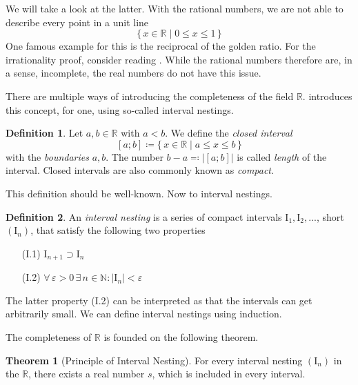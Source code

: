 \documentclass[a4paper, 10pt]{article}
\theoremstyle{remark}
\theoremstyle{definition}
\newtheorem{definition}{Definition}
\newtheorem*{theorem*}{Theorem}
\begin{document}
    We will take a look at the latter. With the rational numbers, we are not able to describe every point in a unit line
    \[
        \{\,x \in \mathbb{R} \mid 0 \leq x \leq 1 \,\}
    \]
    One famous example for this is the reciprocal of the golden ratio. For the irrationality proof, consider reading \cite{analysiskoenigsberger}. While the rational numbers therefore are, in a sense, incomplete, the real numbers do not have this issue.

    There are multiple ways of introducing the completeness of the field \(\mathbb{R}\). \cite{analysiskoenigsberger} introduces this concept, for one, using so-called interval nestings.

    \begin{definition}
        Let \(a, b \in \mathbb{R}\) with \(a < b\). We define the \emph{closed interval}
        \[
            [a; b] \coloneqq \{\, x \in \mathbb{R} \mid a \leq x \leq b \,\}
        \]
        with the \emph{boundaries} \(a, b\). The number \(b - a \eqqcolon |[a; b]|\) is called \emph{length} of the interval. Closed intervals are also commonly known as \emph{compact}.
    \end{definition}

    This definition should be well-known. Now to interval nestings.

    \newcommand{\intv}{\text{I}}
    \begin{definition}
        An \emph{interval nesting} is a series of compact intervals \(\intv_1, \intv_2, ...\), short \((\intv_n)\), that satisfy the following two properties

        \begin{itemize}[label={}]
            \item[(I.1)] \(\intv_{n+1} \supset \intv_n\)
            
            \item[(I.2)] \(\forall \, \varepsilon > 0 \, \exists \, n \in \mathbb{N}\colon |\intv_n| < \varepsilon\)
        \end{itemize}

    \end{definition}

    The latter property (I.2) can be interpreted as that the intervals can get arbitrarily small. We can define interval nestings using induction.

    The completeness of \(\mathbb{R}\) is founded on the following theorem.

    \begin{mdframed}[innertopmargin=0]
        \begin{theorem*}[Principle of Interval Nesting]
            For every interval nesting \((\intv_n)\) in the \(\mathbb{R}\), there exists a real number \(s\), which is included in every interval.
        \end{theorem*}
    \end{mdframed}
\end{document}
